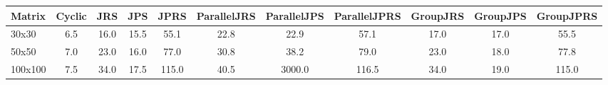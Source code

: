 \begin{tabular}{lcccccccccc}
\toprule
Matrix & Cyclic & JRS & JPS & JPRS & ParallelJRS & ParallelJPS & ParallelJPRS & GroupJRS & GroupJPS & GroupJPRS \\
\midrule
30x30 & 6.5 & 16.0 & 15.5 & 55.1 & 22.8 & 22.9 & 57.1 & 17.0 & 17.0 & 55.5 \\
50x50 & 7.0 & 23.0 & 16.0 & 77.0 & 30.8 & 38.2 & 79.0 & 23.0 & 18.0 & 77.8 \\
100x100 & 7.5 & 34.0 & 17.5 & 115.0 & 40.5 & 3000.0 & 116.5 & 34.0 & 19.0 & 115.0 \\
\bottomrule
\end{tabular}
